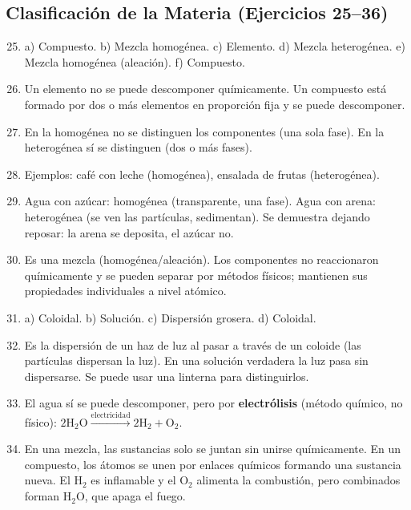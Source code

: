 \documentclass[12pt, a4paper]{article}
\begin{document}
\subsection*{Clasificación de la Materia (Ejercicios 25--36)}

\begin{enumerate}[leftmargin=*, label=\textbf{\arabic*.}]
  \setcounter{enumi}{24}
  \item a) Compuesto. b) Mezcla homogénea. c) Elemento. d) Mezcla heterogénea. e) Mezcla homogénea (aleación). f) Compuesto.

  \item Un elemento no se puede descomponer químicamente. Un compuesto está formado por dos o más elementos en proporción fija y se puede descomponer.

  \item En la homogénea no se distinguen los componentes (una sola fase). En la heterogénea sí se distinguen (dos o más fases).

  \item Ejemplos: café con leche (homogénea), ensalada de frutas (heterogénea).

  \item Agua con azúcar: homogénea (transparente, una fase). Agua con arena: heterogénea (se ven las partículas, sedimentan). Se demuestra dejando reposar: la arena se deposita, el azúcar no.

  \item Es una mezcla (homogénea/aleación). Los componentes no reaccionaron químicamente y se pueden separar por métodos físicos; mantienen sus propiedades individuales a nivel atómico.

  \item a) Coloidal. b) Solución. c) Dispersión grosera. d) Coloidal.

  \item Es la dispersión de un haz de luz al pasar a través de un coloide (las partículas dispersan la luz). En una solución verdadera la luz pasa sin dispersarse. Se puede usar una linterna para distinguirlos.

  \item El agua sí se puede descomponer, pero por \textbf{electrólisis} (método químico, no físico): $2\text{H}_2\text{O} \xrightarrow{\text{electricidad}} 2\text{H}_2 + \text{O}_2$.

  \item En una mezcla, las sustancias solo se juntan sin unirse químicamente. En un compuesto, los átomos se unen por enlaces químicos formando una sustancia nueva. El H$_2$ es inflamable y el O$_2$ alimenta la combustión, pero combinados forman H$_2$O, que apaga el fuego.


\end{enumerate}
\end{document}
